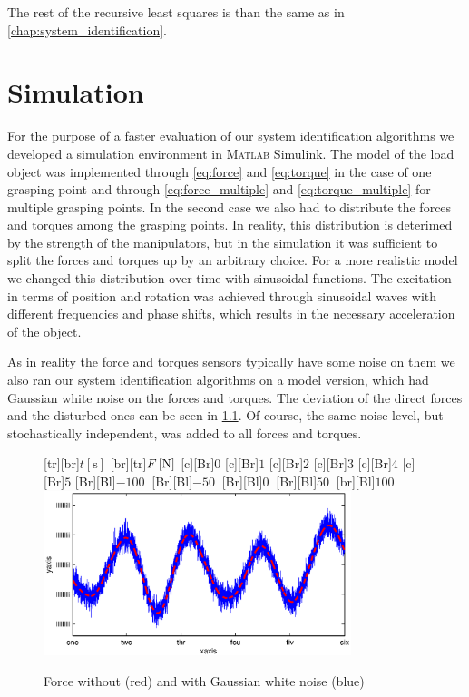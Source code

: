 The rest of the recursive least squares is than the same as in \ref{chap:system_identification}.

\chapter{Simulation}
\label{chap:simulation}
For the purpose of a faster evaluation of our system identification algorithms we developed a simulation environment in \textsc{Matlab} Simulink. The model of the load object was implemented through \ref{eq:force} and \ref{eq:torque} in the case of one grasping point and through \ref{eq:force_multiple} and \ref{eq:torque_multiple} for multiple grasping points. In the second case we also had to distribute the forces and torques among the grasping points. In reality, this distribution is deterimed by the strength of the manipulators, but in the simulation it was sufficient to split the forces and torques up by an arbitrary choice. For a more realistic model we changed this distribution over time with sinusoidal functions. The excitation in terms of position and rotation was achieved through sinusoidal waves with different frequencies and phase shifts, which results in the necessary acceleration of the object.

As in reality the force and torques sensors typically have some noise on them we also ran our system identification algorithms on a model version, which had Gaussian white noise on the forces and torques. The deviation of the direct forces and the disturbed ones can be seen in \ref{fig:force_noisy}. Of course, the same noise level, but stochastically independent, was added to all forces and torques.

\begin{figure}
	\centering	
	[tr][br]{$t\left[\mathrm{s}\right]$}
	[br][tr]{$F\left[\mathrm{N}\right]$}
	[Br]{$0$}
	[Br]{$1$}
	[Br]{$2$}
	[Br]{$3$}
	[Br]{$4$}
	[Br]{$5$}
	[Br][Bl]{$-100\  $}
	[Br][Bl]{$-50\  $}
	[Br][Bl]{$0\  $}
	[Br][Bl]{$50\  $}
	[br][Bl]{$100\  $}
	\includegraphics[width=0.8\textwidth]{figures/forces.eps}
	\vspace{0.2cm}
	\caption{Force without (red) and with Gaussian white noise (blue)}
	\label{fig:force_noisy}
\end{figure}

